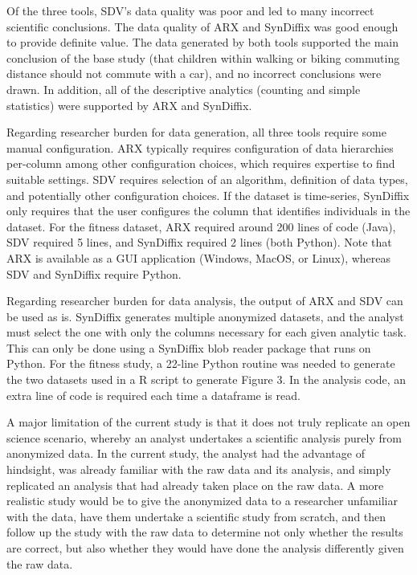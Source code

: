 \documentclass[10pt]{article}
\begin{document}
Of the three tools, SDV’s data quality was poor and led to many incorrect scientific conclusions.  The data quality of ARX and SynDiffix was good enough to provide definite value. The data generated by both tools supported the main conclusion of the base study (that children within walking or biking commuting distance should not commute with a car), and no incorrect conclusions were drawn. In addition, all of the descriptive analytics (counting and simple statistics) were supported by ARX and SynDiffix. 

Regarding researcher burden for data generation, all three tools require some manual configuration. ARX typically requires configuration of data hierarchies per-column among other configuration choices, which requires expertise to find suitable settings.  SDV requires selection of an algorithm, definition of data types, and potentially other configuration choices. If the dataset is time-series, SynDiffix only requires that the user configures the column that identifies individuals in the dataset. For the fitness dataset, ARX required around 200 lines of code (Java), SDV required 5 lines, and SynDiffix required 2 lines (both Python). Note that ARX is available as a GUI application (Windows, MacOS, or Linux), whereas SDV and SynDiffix require Python.

Regarding researcher burden for data analysis, the output of ARX and SDV can be used as is. SynDiffix generates multiple anonymized datasets, and the analyst must select the one with only the columns necessary for each given analytic task. This can only be done using a SynDiffix blob reader package that runs on Python. For the fitness study, a 22-line Python routine was needed to generate the two datasets used in a R script to generate Figure 3. In the analysis code, an extra line of code is required each time a dataframe is read.

A major limitation of the current study is that it does not truly replicate an open science scenario, whereby an analyst undertakes a scientific analysis purely from anonymized data. In the current study, the analyst had the advantage of hindsight, was already familiar with the raw data and its analysis, and simply replicated an analysis that had already taken place on the raw data. A more realistic study would be to give the anonymized data to a researcher unfamiliar with the data, have them undertake a scientific study from scratch, and then follow up the study with the raw data to determine not only whether the results are correct, but also whether they would have done the analysis differently given the raw data.
\end{document}
